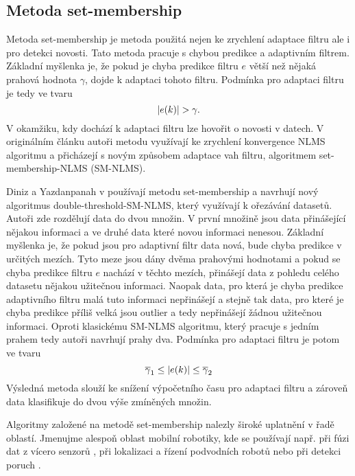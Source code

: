 \subsection{Metoda set-membership}
Metoda set-membership \cite{diniz0,set_member} je metoda použitá nejen ke zrychlení adaptace filtru ale i pro detekci novosti. Tato metoda pracuje s chybou predikce a adaptivním filtrem. Základní myšlenka je, že pokud je chyba predikce filtru $e$ větší než nějaká prahová hodnota $\gamma$, dojde k adaptaci tohoto filtru. Podmínka pro adaptaci filtru je tedy ve tvaru 
\begin{equation}
\lvert e(k)\rvert > \gamma.
\end{equation} V okamžiku, kdy dochází k adaptaci filtru lze hovořit o  novosti v datech. V originálním článku \cite{set_member} autoři metodu využívají ke zrychlení konvergence NLMS algoritmu a přicházejí s novým způsobem adaptace vah filtru, algoritmem set-membership-NLMS (SM-NLMS). 
\par 
Diniz a Yazdanpanah v \cite{diniz1} používají metodu set-membership a navrhují nový algoritmus double-threshold-SM-NLMS, který využívají k ořezávání datasetů. Autoři zde rozdělují data do dvou množin. V první množině jsou data přinášející nějakou informaci a ve druhé data které novou informaci nenesou. Základní myšlenka je, že pokud jsou pro adaptivní filtr data nová, bude chyba predikce v určitých mezích.  Tyto meze jsou dány dvěma prahovými hodnotami a pokud se chyba predikce filtru $e$ nachází v těchto mezích, přinášejí data z pohledu celého datasetu nějakou užitečnou informaci. Naopak data, pro která je chyba predikce adaptivního filtru malá tuto informaci nepřinášejí a stejně tak data, pro které je chyba predikce příliš velká jsou outlier a tedy nepřinášejí žádnou užitečnou informaci. Oproti klasickému SM-NLMS algoritmu, který pracuje s jedním prahem tedy autoři navrhují prahy dva. Podmínka pro adaptaci filtru je potom ve tvaru
\begin{equation}
\overline{\gamma}_1 \leq \lvert e(k)\rvert \leq \overline{\gamma}_2
\end{equation}
Výsledná metoda slouží ke snížení výpočetního času pro adaptaci filtru a zároveň data klasifikuje do dvou výše zmíněných množin.
\par
Algoritmy založené na metodě set-membership nalezly široké uplatnění v řadě  oblastí. Jmenujme alespoň oblast mobilní robotiky, kde se používají např. při fúzi dat z vícero senzorů \cite{set_member_robot}, při lokalizaci a řízení podvodních robotů \cite{set_member_robot_voda} nebo při detekci poruch \cite{set_member_robot_chyba}. 
